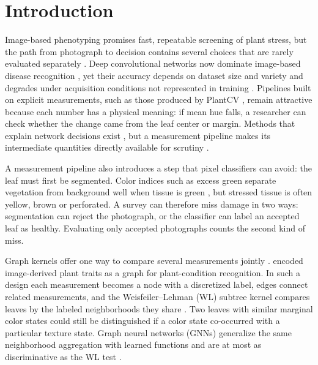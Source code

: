 \section{Introduction}
Image-based phenotyping promises fast, repeatable screening of plant stress, but the path from photograph to decision contains several choices that are rarely evaluated separately \citep{Fahlgren2015,Minervini2015,Singh2016}. Deep convolutional networks now dominate image-based disease recognition \citep{Mohanty2016,Ferentinos2018,Kamilaris2018}, yet their accuracy depends on dataset size and variety and degrades under acquisition conditions not represented in training \citep{Barbedo2016,Barbedo2018}. Pipelines built on explicit measurements, such as those produced by PlantCV \citep{Gehan2017}, remain attractive because each number has a physical meaning: if mean hue falls, a researcher can check whether the change came from the leaf center or margin. Methods that explain network decisions exist \citep{Ghosal2018}, but a measurement pipeline makes its intermediate quantities directly available for scrutiny \citep{Lobet2017}.

A measurement pipeline also introduces a step that pixel classifiers can avoid: the leaf must first be segmented. Color indices such as excess green separate vegetation from background well when tissue is green \citep{Woebbecke1995,Meyer2008}, but stressed tissue is often yellow, brown or perforated. A survey can therefore miss damage in two ways: segmentation can reject the photograph, or the classifier can label an accepted leaf as healthy. Evaluating only accepted photographs counts the second kind of miss.

Graph kernels offer one way to compare several measurements jointly \citep{Kriege2020,Borgwardt2020}. \citet{Sriram2026} encoded image-derived plant traits as a graph for plant-condition recognition. In such a design each measurement becomes a node with a discretized label, edges connect related measurements, and the Weisfeiler--Lehman (WL) subtree kernel compares leaves by the labeled neighborhoods they share \citep{Shervashidze2011}. Two leaves with similar marginal color states could still be distinguished if a color state co-occurred with a particular texture state. Graph neural networks (GNNs) generalize the same neighborhood aggregation with learned functions and are at most as discriminative as the WL test \citep{Xu2019,Morris2019}.

